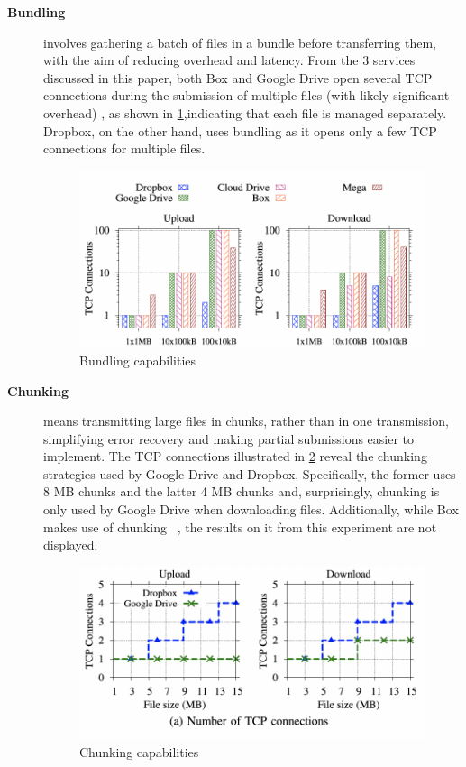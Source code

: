 \begin{description}
	\item[\textbf{Bundling}] involves gathering a batch of files in a bundle before transferring them, with the aim of reducing overhead and latency. From the 3 services discussed in this paper, both Box and Google Drive open several TCP connections during the submission of multiple files (with likely significant overhead) , as shown in  \ref{fig:bundling},indicating that each file is managed separately. Dropbox, on the other hand, uses bundling as it opens only a few TCP connections for multiple files.
	
	\begin{figure} [h]
		\centering
		\includegraphics[scale=0.7]{images/bundling}
		\caption{\label{fig:bundling}Bundling capabilities}
	\end{figure}
	
	\item[\textbf{Chunking}] means transmitting large files in chunks, rather than in one transmission, simplifying error recovery and making partial submissions easier to implement. The TCP connections illustrated in \ref{fig:chunking} reveal the chunking strategies used by Google Drive and Dropbox. Specifically, the former uses 8 MB chunks and the latter 4 MB chunks and, surprisingly, chunking is only used by Google Drive when downloading files. Additionally, while Box makes use of chunking ~\cite{box_chunked}, the results on it from this experiment are not displayed.
	
	\begin{figure} [h]
		\centering
		\includegraphics[scale=0.7]{images/chunking}
		\caption{\label{fig:chunking}Chunking capabilities}
	\end{figure}
	

\end{description}
